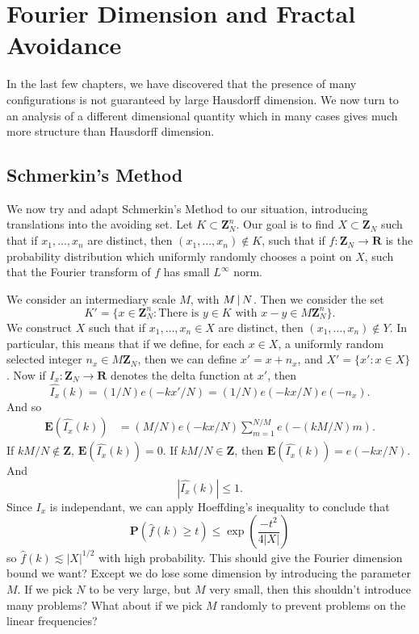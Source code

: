 
\chapter{Fourier Dimension and Fractal Avoidance}
\label{ch:RoughSets}


In the last few chapters, we have discovered that the presence of many configurations is not guaranteed by large Hausdorff dimension. We now turn to an analysis of a different dimensional quantity which in many cases gives much more structure than Hausdorff dimension. 




\section{Schmerkin's Method}

We now try and adapt Schmerkin's Method to our situation, introducing translations into the avoiding set. Let $K \subset \mathbf{Z}_N^n$. Our goal is to find $X \subset \mathbf{Z}_N$ such that if $x_1, \dots, x_n$ are distinct, then $(x_1, \dots, x_n) \not \in K$, such that if $f: \mathbf{Z}_N \to \mathbf{R}$ is the probability distribution which uniformly randomly chooses a point on $X$, such that the Fourier transform of $f$ has small $L^\infty$ norm.

We consider an intermediary scale $M$, with $M \operatorname{\mid} N$. Then we consider the set
%
\[ K' = \{ x \in \mathbf{Z}_N^n : \text{There is $y \in K$ with $x - y \in M \mathbf{Z}_N^n$} \}. \]
%
We construct $X$ such that if $x_1, \dots, x_n \in X$ are distinct, then $(x_1, \dots, x_n) \not \in Y$. In particular, this means that if we define, for each $x \in X$, a uniformly random selected integer $n_x \in M \mathbf{Z}_N$, then we can define $x' = x + n_x$, and $X' = \{ x' : x \in X \}$. Now if $I_x: \mathbf{Z}_N \to \mathbf{R}$ denotes the delta function at $x'$, then
%
\[ \widehat{I_x}(k) = (1/N) e(-kx'/N) = (1/N) e(-kx/N) e(-n_x). \]
%
And so
%
\begin{align*}
	\mathbf{E}(\widehat{I_x}(k)) &= (M/N) e(-kx/N) \sum_{m = 1}^{N/M} e(-(kM/N)m).
\end{align*}
%
If $kM/N \not \in \mathbf{Z}$, $\mathbf{E}(\widehat{I_x}(k)) = 0$. If $kM/N \in \mathbf{Z}$, then $\mathbf{E}(\widehat{I_x}(k)) = e(-kx/N)$. And
%
\[ |\widehat{I_x}(k)| \leq 1. \]
%
Since $I_x$ is independant, we can apply Hoeffding's inequality to conclude that
%
\[ \mathbf{P} \left( \widehat{f}(k) \geq t \right) \leq \exp \left( \frac{-t^2}{4|X|} \right) \]
%
so $\widehat{f}(k) \lesssim |X|^{1/2}$ with high probability. This should give the Fourier dimension bound we want? Except we do lose some dimension by introducing the parameter $M$. If we pick $N$ to be very large, but $M$ very small, then this shouldn't introduce many problems? What about if we pick $M$ randomly to prevent problems on the linear frequencies?






